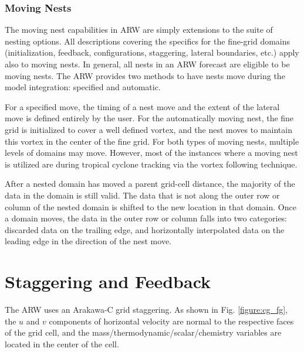 \subsubsection{Moving Nests}

The moving nest capabilities in ARW are simply extensions to the 
suite of nesting options.  All descriptions covering the 
specifics for the fine-grid
domains (initialization, feedback, configurations, staggering,
lateral boundaries, etc.) apply also to moving nests.  In
general, all nests
in an ARW forecast are eligible to be moving nests.  The ARW
provides two methods to have nests move during the model
integration: specified and automatic.

For a specified move, the timing of a nest move and the extent
of the lateral move is defined entirely by the user.  For the
automatically moving nest, the fine grid is initialized to cover
a well defined vortex, and the nest moves to maintain this vortex
in the center of the fine grid.  For both types of moving nests,
multiple levels of domains may move.  However, most of the 
instances where a moving nest is utilized are during tropical
cyclone tracking via the vortex following technique.  

After a nested domain has moved a parent grid-cell distance,
the majority of the data in the domain is still valid.  The
data that is not along the outer row or column of the nested
domain is shifted to the new location in that domain.  
Once a domain moves, the data in the outer
row or column falls into two categories: discarded data on the
trailing edge, and horizontally interpolated data on the
leading edge in the direction of the nest move.  

\section{Staggering and Feedback}

The ARW uses an Arakawa-C grid staggering.  As shown in Fig.
\ref{figure:cg_fg}, the $u$ and $v$ components 
of horizontal velocity are normal to the respective faces of the 
grid cell, and the mass/thermodynamic/scalar/chemistry variables are located 
in the center of the cell.   

